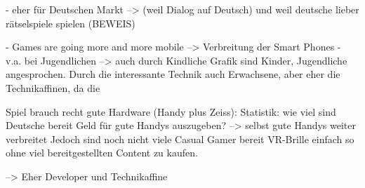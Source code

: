 
- eher für Deutschen Markt --> (weil Dialog auf Deutsch) und weil deutsche lieber rätselspiele spielen (BEWEIS)

- Games are going more and more mobile --> Verbreitung der Smart Phones - v.a. bei Jugendlichen 
--> auch durch Kindliche Grafik sind Kinder, Jugendliche angesprochen.
Durch die interessante Technik auch Erwachsene, aber eher die Technikaffinen, da die 

Spiel brauch recht gute Hardware (Handy plus Zeiss):
Statistik: wie viel sind Deutsche bereit Geld für gute Handys auszugeben? --> selbst gute Handys weiter verbreitet
Jedoch sind noch nicht viele Casual Gamer bereit VR-Brille einfach so ohne viel bereitgestellten Content zu kaufen.

--> Eher Developer und Technikaffine
